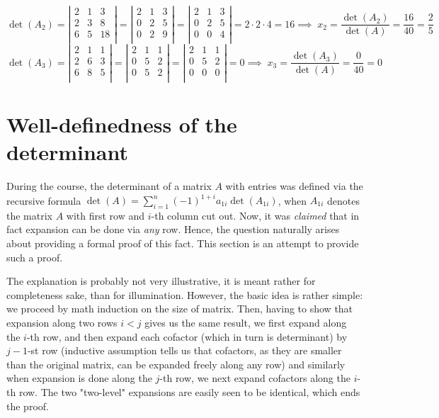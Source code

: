 \documentclass[8pt]{article} %
\begin{document}
\begin{myeg}
\[\det(A_2)=\left|\begin{array}{rrr}2&1&3\\2&3&8\\6&5&18\\
\end{array}\right|=
\left|\begin{array}{rrr}
	2&1&3\\0&2&5\\0&2&9\\
\end{array}\right|=
\left|\begin{array}{rrr}
	2&1&3\\0&2&5\\0&0&4\\
\end{array}\right|=2\cdot2\cdot4=16
	\implies\;x_2=\frac{\det(A_2)}{\det(A)}=\frac{16}{40}=\frac{2}{5}\]
\[\det(A_3)=
\left|\begin{array}{rrr}
2&1&1\\
2&6&3\\
6&8&5\\
\end{array}\right|=
\left|\begin{array}{rrr}
2&1&1\\
0&5&2\\
0&5&2\\
\end{array}\right|=
\left|\begin{array}{rrr}
2&1&1\\
0&5&2\\
0&0&0\\
\end{array}\right|=0
	\implies\;x_3=\frac{\det(A_3)}{\det(A)}=\frac{0}{40}=0\]
\end{myeg}
\section{Well-definedness of the determinant}
During the course, the determinant of a matrix $A$ with
entries was defined via the recursive formula $\det(A)=\sum_{i=1}^n(-1)^{1+i}a_{1i}\det(A_{1i})$,
when $A_{1i}$ denotes the matrix $A$ with first row and $i$-th column cut out. Now, it was \textit{claimed} that in fact expansion
can be done via \textit{any} row. Hence, the question naturally arises about providing a formal proof of this fact. This section
is an attempt to provide such a proof. 

The explanation is probably not very illustrative, it is meant rather for completeness sake, than for illumination. However, the basic idea
is rather simple: we proceed by math induction on the size of matrix. Then, having to show that expansion along two rows $i<j$ gives us the same
result, we first expand along the $i$-th row, and then expand each cofactor (which in turn is determinant) by $j-1$-st row (inductive assumption
tells us that cofactors, as they are smaller than the original matrix, can be expanded freely along any row) and similarly when
expansion is done along the $j$-th row, we next expand cofactors along the $i$-th row. The two "two-level" expansions are easily seen to be
identical, which ends the proof.
\end{document}
